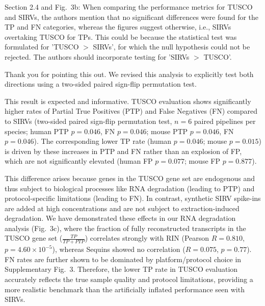 \documentclass[11pt]{article}
\newcommand{\tuscoGeneSet}{TUSCO gene set}
\begin{document}
\begin{reviewercomment}
Section 2.4 and Fig.~3b: When comparing the performance metrics for TUSCO and SIRVs, the authors mention that no significant differences were found for the TP and FN categories, whereas the figures suggest otherwise, i.e., SIRVs overtaking TUSCO for TPs. This could be because the statistical test was formulated for 'TUSCO $>$ SIRVs', for which the null hypothesis could not be rejected. The authors should incorporate testing for 'SIRVs $>$ TUSCO'.
\end{reviewercomment}

\begin{responseboxnew}
Thank you for pointing this out. We revised this analysis to explicitly test both directions using a two-sided paired sign-flip permutation test.

\vspace{0.3cm}
This result is expected and informative. TUSCO evaluation shows significantly higher rates of Partial True Positives (PTP) and False Negatives (FN) compared to SIRVs (two-sided paired sign-flip permutation test, $n=6$ paired pipelines per species; human PTP $p=0.046$, FN $p=0.046$; mouse PTP $p=0.046$, FN $p=0.046$). The corresponding lower TP rate (human $p=0.046$; mouse $p=0.015$) is driven by these increases in PTP and FN rather than an explosion of FP, which are not significantly elevated (human FP $p=0.077$; mouse FP $p=0.877$).

\vspace{0.3cm}
This difference arises because genes in the \tuscoGeneSet{} are endogenous and thus subject to biological processes like RNA degradation (leading to PTP) and protocol-specific limitations (leading to FN). In contrast, synthetic SIRV spike-ins are added at high concentrations and are not subject to extraction-induced degradation. We have demonstrated these effects in our RNA degradation analysis (Fig.~3c), where the fraction of fully reconstructed transcripts in the TUSCO gene set ($\frac{TP}{TP+PTP}$) correlates strongly with RIN (Pearson $R=0.810$, $p=4.60 \times 10^{-5}$), whereas Sequins showed no correlation ($R=0.075$, $p=0.77$). FN rates are further shown to be dominated by platform/protocol choice in Supplementary Fig.~3. Therefore, the lower TP rate in TUSCO evaluation accurately reflects the true sample quality and protocol limitations, providing a more realistic benchmark than the artificially inflated performance seen with SIRVs.


\end{responseboxnew}
\end{document}
